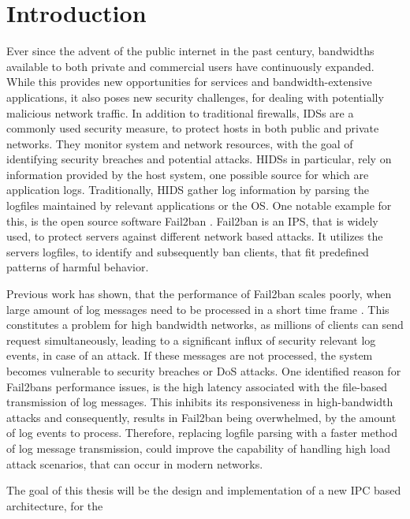 %
%

\chapter{Introduction}
\label{sec:intro}

Ever since the advent of the public internet in the past century, bandwidths available to both
private and commercial users have continuously expanded. While this provides new opportunities for services and bandwidth-extensive 
applications, it also poses new security challenges, for dealing with potentially malicious network traffic. In addition to traditional firewalls, 
\acp{IDS} are a commonly used security measure, to protect hosts in both public and private networks. They
monitor system and network resources, with the goal of identifying security breaches and potential attacks. \acp{HIDS} in particular, rely
on information provided by the host system, one possible source for which are application logs. Traditionally, \ac{HIDS} gather log information by 
parsing the logfiles maintained by relevant applications or the \ac{OS}. One notable example for this, is the open source software Fail2ban \cite{fail2ban}. Fail2ban is
an \ac{IPS}, that is widely used, to protect servers against different network based attacks. It
utilizes the servers logfiles, to identify and subsequently ban clients, that fit predefined patterns of harmful behavior. 
\par
Previous work has shown, that the performance of Fail2ban scales poorly, when large amount of log messages need to be processed in a short time frame \cite{mikolajczak2022}. This constitutes
a problem for high bandwidth networks, as millions of clients can send request simultaneously, leading to a significant influx of security relevant log events, in case of an attack.  
If these messages are not processed, the system becomes vulnerable to security breaches or \ac{DoS} attacks. One identified reason for Fail2bans performance issues, is the high latency associated with
the file-based transmission of log messages. This inhibits its responsiveness in high-bandwidth attacks and consequently, results in Fail2ban being overwhelmed, by the amount of log events to process. 
Therefore, replacing logfile parsing with a faster method of log message transmission, could improve the capability of handling high load attack scenarios, that can occur in modern networks. 
\par
The goal of this thesis will be the design and implementation of a new \ac{IPC} based architecture, for the
